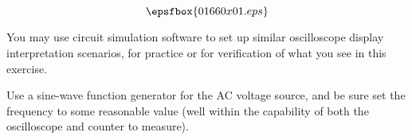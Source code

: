 

$$\epsfbox{01660x01.eps}$$

\vfil \eject






You may use circuit simulation software to set up similar oscilloscope display interpretation scenarios, for practice or for verification of what you see in this exercise.







Use a sine-wave function generator for the AC voltage source, and be sure set the frequency to some reasonable value (well within the capability of both the oscilloscope and counter to measure).




